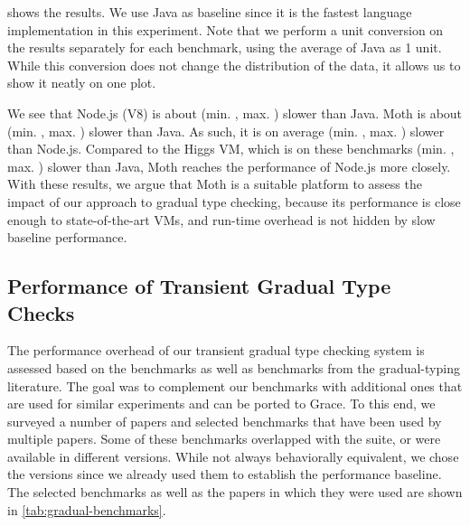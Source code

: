  shows the results.
We use Java as baseline since it is the fastest language implementation
in this experiment.
Note that we perform a unit conversion on the results separately for each benchmark,
using the average of Java as 1 unit.
While this conversion does not change the distribution of the data,
it allows us to show it neatly on one plot.

We see that Node.js (V8) is about
\OverheadNodeGMeanX (min. \OverheadNodeMinX, max. \OverheadNodeMaxX)
slower than Java.
Moth is about \OverheadMothGMeanX (min. \OverheadMothMinX, max. \OverheadMothMaxX) slower than Java.
As such, it is on average \OverheadMothNodeGMeanP (min. \OverheadMothNodeMinP, max. \OverheadMothNodeMaxX) slower than Node.js.
Compared to the Higgs VM, which is on these benchmarks
\OverheadHiggsGMeanX (min. \OverheadHiggsMinX, max. \OverheadHiggsMaxX) slower than Java,
Moth reaches the performance of Node.js more closely.
With these results, we argue that Moth is a suitable platform to
assess the impact of our approach to gradual type checking,
because its performance is close enough to state-of-the-art VMs,
and run-time overhead is not hidden by slow baseline performance.


\subsection{Performance of Transient Gradual Type Checks}


The performance overhead of our transient gradual type checking system
is assessed based on the \AWFY benchmarks
as well as benchmarks from the gradual-typing literature.
The goal was to complement our benchmarks with additional ones that are
used for similar experiments and can be ported to Grace.
To this end, we surveyed a number of papers\citep{Takikawa2016,Vitousek2017,Muehlboeck2017,Bauman2017,Richards2017,Stulova2016,Greenman2018}
and selected benchmarks that have been used by multiple papers.
Some of these benchmarks overlapped with the \AWFY suite,
or were available in different versions.
While not always behaviorally equivalent,
we chose the \AWFY versions since we already used them to
establish the performance baseline.
The selected benchmarks as well as the papers in which they were used are shown in
\cref{tab:gradual-benchmarks}.

